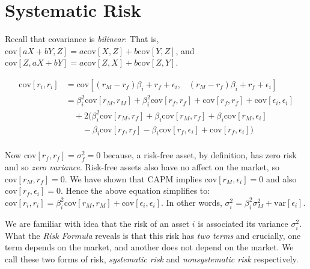 


\section{Systematic Risk}



Recall that covariance is \textit{bilinear}. 
That is, $\text{cov}[aX + bY,Z] = a\text{cov}[X,Z] + b\text{cov}[Y,Z]$,  
and $\text{cov}[Z,aX + bY] = a\text{cov}[Z,X] + b\text{cov}[Z,Y]$. 

\[
\begin{array}{ll}
 \text{cov}[r_i, r_i] & = \text{cov}[(r_M-r_f)\beta_i + r_f + \epsilon_i, \;\;\;(r_M-r_f)\beta_i + r_f + \epsilon_i] \\
 &= \beta_i^2 \text{cov}[r_M, r_M] + \beta_i^2 \text{cov}[r_f, r_f] + \text{cov}[r_f, r_f] + \text{cov}[\epsilon_i, \epsilon_i]  \\
 &\quad + 2( \beta^2_i \text{cov}[r_M, r_f] + \beta_i \text{cov}[r_M, r_f] + \beta_i \text{cov}[r_M, \epsilon_i] \\
 &\quad\quad  - \beta_i \text{cov}[r_f, r_f] - \beta_i \text{cov}[r_f, \epsilon_i] + \text{cov}[r_f, \epsilon_i]) \\
\end{array}
\]

Now $\text{cov}[r_f, r_f] = \sigma^2_f = 0$ because, a risk-free asset, by definition, has zero risk and so
 \textit{zero variance}. Risk-free assets also have no affect on the market, so 
 $\text{cov}[r_M, r_f] = 0$. We have shown that CAPM implies $\text{cov}[r_M, \epsilon_i] = 0$
and also $\text{cov}[r_f, \epsilon_i] = 0$. Hence the above equation simplifies to:
$\text{cov}[r_i, r_i] = \beta_i^2 \text{cov}[r_M, r_M] + \text{cov}[\epsilon_i, \epsilon_i]$. 
In other words, $\sigma^2_i = \beta_i^2 \sigma^2_M + \text{var}[\epsilon_i]$. 


We are familiar with idea that the risk of an asset $i$ is associated its variance $\sigma^2_i$. 
What the \textit{Risk Formula} reveals is that this risk has \textit{two terms} and crucially, 
one term depends on the market, and another does not depend on the market. 
We call these two forms of risk, \textit{systematic risk} and \textit{nonsystematic risk} 
respectively. 

